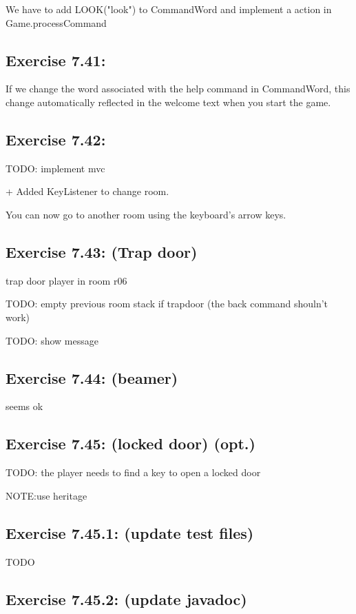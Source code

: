 \documentclass[twoside,french]{report}
\begin{document}
We have to add LOOK("look") to CommandWord and implement a action in Game.processCommand

\subsection*{Exercise 7.41:}

If we change the word associated with the help command in CommandWord, this change automatically reflected in the welcome text when you start the game.

\subsection*{Exercise 7.42:}

TODO: implement mvc

+ Added KeyListener to change room.

You can now go to another room using the keyboard's arrow keys.

\subsection*{Exercise 7.43: (Trap door)}

trap door player in room r06

TODO: empty previous room stack if trapdoor (the back command shouln't work)

TODO: show message

\subsection*{Exercise 7.44: (beamer)}

seems ok

\subsection*{Exercise 7.45: (locked door) (opt.)}

TODO: the player needs to find a key to open a locked door

NOTE:use heritage

\subsection*{Exercise 7.45.1: (update test files)}

TODO

\subsection*{Exercise 7.45.2: (update javadoc)}
\end{document}
